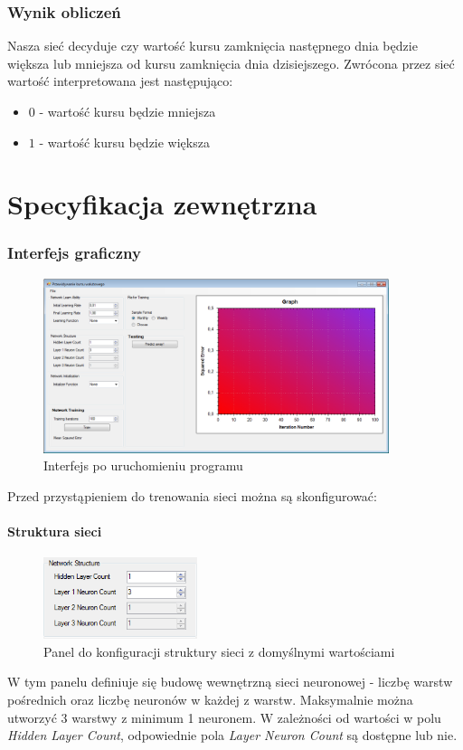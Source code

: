 \documentclass[a4paper]{article}
\begin{document}
		\section{Wynik obliczeń}\indent\indent
			Nasza sieć decyduje czy wartość kursu zamknięcia następnego dnia będzie większa lub mniejsza od kursu zamknięcia dnia dzisiejszego. Zwrócona przez sieć wartość interpretowana jest następująco:
			\begin{itemize}
				\item $ 0 $ - wartość kursu będzie mniejsza
				\item $ 1 $ - wartość kursu będzie większa
			\end{itemize}
		\newpage
	\part{Specyfikacja zewnętrzna}
		\section{Interfejs graficzny}
			\begin{figure}[h!]
				\centering
				\includegraphics[width=0.90\textwidth]{./img/GUI}
				\caption{Interfejs po uruchomieniu programu}
			\end{figure}
			Przed przystąpieniem do trenowania sieci można są skonfigurować:
			\subsection{Struktura sieci}
				\begin{figure}[h!]
					\centering
					\includegraphics[width=0.40\textwidth]{./img/GUI_network_structure}
					\caption{Panel do konfiguracji struktury sieci z domyślnymi wartościami}
				\end{figure}
				W tym panelu definiuje się budowę wewnętrzną sieci neuronowej - liczbę warstw pośrednich oraz liczbę neuronów w każdej z warstw. Maksymalnie można utworzyć 3 warstwy z minimum 1 neuronem. W zależności od wartości w polu \emph{Hidden Layer Count}, odpowiednie pola \emph{Layer Neuron Count} są dostępne lub nie.
			\newpage
\end{document}
